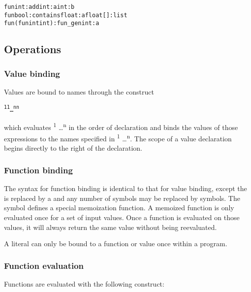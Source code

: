 \begin{alltt}
\quad fun int:add int:a int:b
\quad fun bool:contains float:a float[]:list
\quad fun (fun int int):fun_gen int:a
\end{alltt}

\subsection{Operations}

\subsubsection{Value binding}

Values are bound to names through the construct 

\begin{alltt}
\quad {}\textsuperscript{1} \term{=} \textsuperscript{1}   \dots {} \textsuperscript{n} \term{=} \textsuperscript{n}  
\end{alltt}

which evaluates  \textsuperscript{1} \dots  {}\textsuperscript{n} in the order of declaration and binds the values of those expressions to the names specified in \textsuperscript{1} \dots {}\textsuperscript{n}. The scope of a value declaration begins directly to the right of the declaration.

\subsubsection{Function binding}

The syntax for function binding is identical to that for value binding, except the  is replaced by  a  and any number of \term{=} symbols may be replaced by \term{:=} symbols. The \term{:=} symbol defines a special memoization function. A memoized function is only evaluated once for a set of input values. Once a function is evaluated on those values, it will always return the same value without being reevaluated. 

A literal can only be bound to a function or value once within a program.

\subsubsection{Function evaluation}
Functions are evaluated with the following construct:

